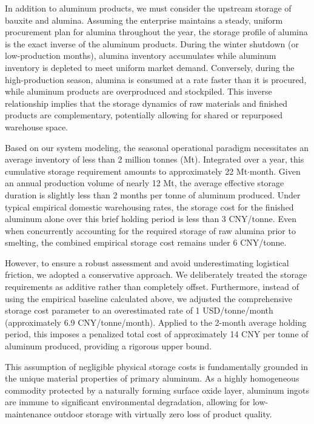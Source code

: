 \documentclass[preprint,12pt]{elsarticle}
\begin{document}
In addition to aluminum products, we must consider the upstream storage of bauxite and alumina. Assuming the enterprise maintains a steady, uniform procurement plan for alumina throughout the year, the storage profile of alumina is the exact inverse of the aluminum products. During the winter shutdown (or low-production months), alumina inventory accumulates while aluminum inventory is depleted to meet uniform market demand. Conversely, during the high-production season, alumina is consumed at a rate faster than it is procured, while aluminum products are overproduced and stockpiled. This inverse relationship implies that the storage dynamics of raw materials and finished products are complementary, potentially allowing for shared or repurposed warehouse space.

Based on our system modeling, the seasonal operational paradigm necessitates an average inventory of less than 2 million tonnes (Mt). Integrated over a year, this cumulative storage requirement amounts to approximately 22 Mt$\cdot$month. Given an annual production volume of nearly 12 Mt, the average effective storage duration is slightly less than 2 months per tonne of aluminum produced. Under typical empirical domestic warehousing rates, the storage cost for the finished aluminum alone over this brief holding period is less than 3 CNY/tonne. Even when concurrently accounting for the required storage of raw alumina prior to smelting, the combined empirical storage cost remains under 6 CNY/tonne.

However, to ensure a robust assessment and avoid underestimating logistical friction, we adopted a conservative approach. We deliberately treated the storage requirements as additive rather than completely offset. Furthermore, instead of using the empirical baseline calculated above, we adjusted the comprehensive storage cost parameter to an overestimated rate of 1 USD/tonne/month (approximately 6.9 CNY/tonne/month). Applied to the 2-month average holding period, this imposes a penalized total cost of approximately 14 CNY per tonne of aluminum produced, providing a rigorous upper bound.

This assumption of negligible physical storage costs is fundamentally grounded in the unique material properties of primary aluminum. As a highly homogeneous commodity protected by a naturally forming surface oxide layer, aluminum ingots are immune to significant environmental degradation, allowing for low-maintenance outdoor storage with virtually zero loss of product quality. 
\end{document}
